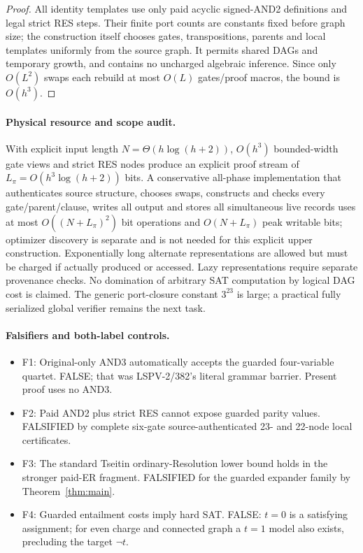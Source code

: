 \documentclass[11pt]{article}
\begin{document}
\begin{proof}
All identity templates use only paid acyclic signed-AND2 definitions and legal strict RES steps. Their finite port counts are constants fixed before graph size; the construction itself chooses gates, transpositions, parents and local templates uniformly from the source graph. It permits shared DAGs and temporary growth, and contains no uncharged algebraic inference. Since only $O(L^2)$ swaps each rebuild at most $O(L)$ gates/proof macros, the bound is $O(h^3)$.
\end{proof}

\paragraph{Physical resource and scope audit.}
With explicit input length $N=\Theta(h\log(h+2))$, $O(h^3)$ bounded-width gate views and strict RES nodes produce an explicit proof stream of $L_\pi=O(h^3\log(h+2))$ bits. A conservative all-phase implementation that authenticates source structure, chooses swaps, constructs and checks every gate/parent/clause, writes all output and stores all simultaneous live records uses at most $O((N+L_\pi)^2)$ bit operations and $O(N+L_\pi)$ peak writable bits; optimizer discovery is separate and is not needed for this explicit upper construction. Exponentially long alternate representations are allowed but must be charged if actually produced or accessed. Lazy representations require separate provenance checks. No domination of arbitrary SAT computation by logical DAG cost is claimed. The generic port-closure constant $3^{23}$ is large; a practical fully serialized global verifier remains the next task.

\paragraph{Falsifiers and both-label controls.}
\begin{itemize}
\item[] F1: Original-only AND3 automatically accepts the guarded four-variable quartet. FALSE; that was LSPV-2/382's literal grammar barrier. Present proof uses no AND3.
\item[] F2: Paid AND2 plus strict RES cannot expose guarded parity values. FALSIFIED by complete six-gate source-authenticated 23- and 22-node local certificates.
\item[] F3: The standard Tseitin ordinary-Resolution lower bound holds in the stronger paid-ER fragment. FALSIFIED for the guarded expander family by Theorem~\ref{thm:main}.
\item[] F4: Guarded entailment costs imply hard SAT. FALSE: $t=0$ is a satisfying assignment; for even charge and connected graph a $t=1$ model also exists, precluding the target $\neg t$.
\end{itemize}
\end{document}
